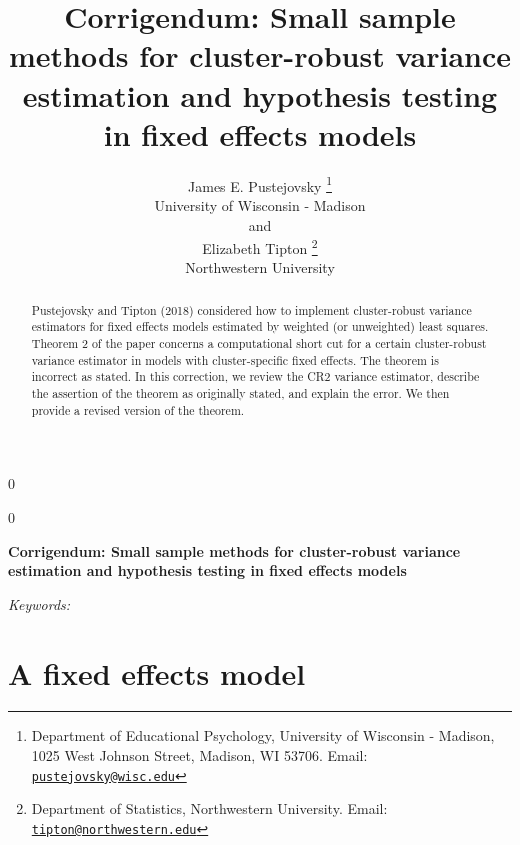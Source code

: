 \documentclass[12pt]{article}
\newcommand{\blind}{0}
\begin{document}
\def\spacingset#1{\renewcommand{\baselinestretch}%
{#1}\small\normalsize} \spacingset{1}



\blind
{
  \title{\bf Corrigendum: Small sample methods for cluster-robust
variance estimation and hypothesis testing in fixed effects models}

  \author{
        James E. Pustejovsky \thanks{Department of Educational
Psychology, University of Wisconsin - Madison, 1025 West Johnson Street,
Madison, WI 53706. Email:
\href{mailto:pustejovsky@wisc.edu}{\nolinkurl{pustejovsky@wisc.edu}}} \\
    University of Wisconsin - Madison\\
     and \\     Elizabeth Tipton \thanks{Department of Statistics,
Northwestern University. Email:
\href{mailto:tipton@northwestern.edu}{\nolinkurl{tipton@northwestern.edu}}} \\
    Northwestern University\\
      }
  \maketitle
} \fi

\blind
{
  \bigskip
  \bigskip
  \bigskip
  \begin{center}
    {\LARGE\bf Corrigendum: Small sample methods for cluster-robust
variance estimation and hypothesis testing in fixed effects models}
  \end{center}
  \medskip
} \fi

\bigskip
\begin{abstract}
Pustejovsky and Tipton (2018) considered how to implement cluster-robust
variance estimators for fixed effects models estimated by weighted (or
unweighted) least squares. Theorem 2 of the paper concerns a
computational short cut for a certain cluster-robust variance estimator
in models with cluster-specific fixed effects. The theorem is incorrect
as stated. In this correction, we review the CR2 variance estimator,
describe the assertion of the theorem as originally stated, and explain
the error. We then provide a revised version of the theorem.
\end{abstract}

\noindent%
{\it Keywords:} 
\vfill

\newpage
\spacingset{1.45} %

\hypertarget{a-fixed-effects-model}{%
\section{A fixed effects model}\label{a-fixed-effects-model}}
\end{document}

